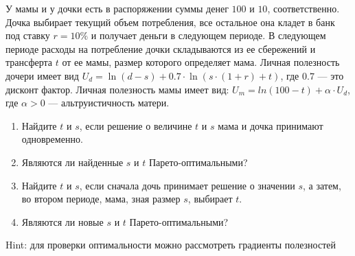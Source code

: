 \begin{problem}
\begin{source} \cite[3.11]{gintis:gte} \end{source}
У мамы и у дочки есть в распоряжении суммы денег  $100$  и  $10$, соответственно. Дочка выбирает текущий объем потребления, все остальное она кладет в банк под ставку  $r=10\%$  и получает деньги в следующем периоде. В следующем периоде расходы на потребление дочки складываются из ее сбережений и трансферта  $t$  от ее мамы, размер которого определяет мама. Личная полезность дочери имеет вид  $U_{d} =\ln(d-s)+0.7\cdot \ln(s\cdot(1+r)+t)$, где  $0.7$  --- это дисконт фактор. Личная полезность мамы имеет вид:  $U_{m} =ln(100-t)+\alpha \cdot U_{d} $, где  $\alpha >0$  --- альтруистичность матери. \par
\begin{enumerate}
\item  Найдите $t$ и $s$, если решение о величине $t$ и $s$ мама и дочка принимают одновременно. \par
\item Являются ли найденные $s$ и $t$ Парето-оптимальными? \par
\item  Найдите $t$ и $s$, если сначала дочь принимает решение о значении $s$, а затем, во втором периоде, мама, зная размер $s$, выбирает $t$. \par
\item Являются ли новые $s$ и $t$ Парето-оптимальными? \par
\end{enumerate}
\begin{rem}
Hint: для проверки оптимальности можно рассмотреть градиенты полезностей \par
\end{rem}




\begin{sol}

\end{sol}
\end{problem}



